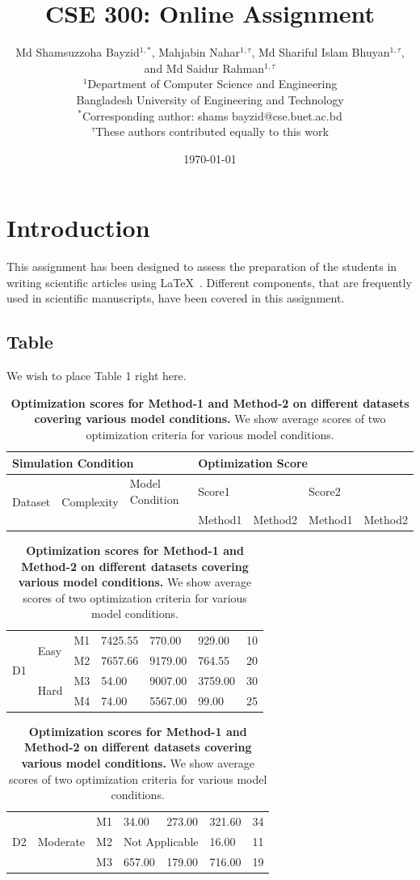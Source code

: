 \documentclass[9pt,a4paper]{article}
\title{CSE 300: Online Assignment}
\author{Md Shamsuzzoha Bayzid$^{1,*}$, Mahjabin Nahar$^{1,\tau}$, Md Shariful Islam Bhuyan$^{1,\tau}$,\\
and Md Saidur Rahman$^{1,\tau}$\\ 
$^1$Department of Computer Science and Engineering\\
Bangladesh University of Engineering and Technology\\
$^*$Corresponding author: shams bayzid@cse.buet.ac.bd\\
$^\tau$These authors contributed equally to this work}
\date{\today}
\begin{document}
\maketitle
\section{Introduction}
This assignment has been designed to assess the preparation of the students in writing
scientific articles using \LaTeX\ . Different components, that are frequently used in scientific
manuscripts, have been covered in this assignment.

\subsection{Table}%
We wish to place Table 1 right here.
\begin{table}[h]
    \centering
    \caption{\textbf{Optimization scores for Method-1 and Method-2 on different datasets
covering various model conditions.} We show average scores of two optimization
criteria for various model conditions.
}
    \begin{tabular}{|p{0.6in}|p{0.6in}p{0.6in}|p{0.6in}p{0.6in}|p{0.6in}p{0.6in}|}
\hline
\multicolumn{3}{|l|}{Simulation Condition}                               & \multicolumn{4}{l|}{Optimization Score}                   \\ \hline
\multirow{2}{*}{Dataset} & \multirow{2}{*}{Complexity} & Model Condition & \multicolumn{2}{l|}{Score1} & \multicolumn{2}{l|}{Score2} \\ \cline{4-7} 
                         &                             &                 & Method1      & Method2      & Method1      & Method2      \\ \hline
\end{tabular}
\begin{tabular}{|p{0.6in}|p{0.6in}p{0.6in}|p{0.6in}p{0.6in}|p{0.6in}p{0.6in}|}
\hline
\multirow{4}{*}{D1} & \multirow{2}{*}{Easy} & M1 & 7425.55 & 770.00  & 929.00  & 10 \\
                    &                       & M2 & 7657.66 & 9179.00 & 764.55  & 20 \\ \cline{2-7} 
                    & \multirow{2}{*}{Hard} & M3 & 54.00   & 9007.00 & 3759.00 & 30 \\
                    &                       & M4 & 74.00   & 5567.00 & 99.00   & 25 \\ \hline
\end{tabular}
\begin{tabular}{|p{0.6in}|p{0.6in}p{0.6in}|p{0.6in}p{0.6in}|p{0.6in}p{0.6in}|}
\hline
\multirow{3}{*}{D2} & \multirow{3}{*}{Moderate} & M1 & 34.00            & 273.00           & 321.60 & 34 \\
                    &                           & M2 & \multicolumn{2}{l|}{Not Applicable} & 16.00  & 11 \\
                    &                           & M3 & 657.00           & 179.00           & 716.00 & 19 \\ \hline
\end{tabular}
    
\end{table}
\end{document}
